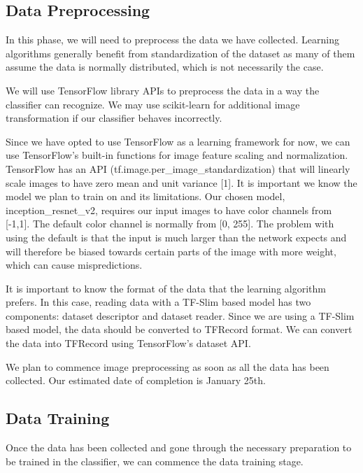 \documentclass[onecolumn, draftclsnofoot,10pt, compsoc]{IEEEtran}
\begin{document}
\subsection{Data Preprocessing}

In this phase, we will need to preprocess the data we have collected. Learning algorithms generally benefit from standardization of the dataset as many of them assume the data is normally distributed, which is not necessarily the case.


We will use TensorFlow library APIs to preprocess the data in a way the classifier can recognize. We may use scikit-learn for additional image transformation if our classifier behaves incorrectly.


Since we have opted to use TensorFlow as a learning framework for now, we can use TensorFlow's built-in functions for image feature scaling and normalization. TensorFlow has an API (tf.image.per\_image\_standardization) that will linearly scale images to have zero mean and unit variance [1]. It is important we know the model we plan to train on and its limitations. Our chosen model, inception\_resnet\_v2, requires our input images to have color channels from [-1,1]. The default color channel is normally from [0, 255]. The problem with using the default is that the input is much larger than the network expects and will therefore be biased towards certain parts of the image with more weight, which can cause mispredictions. 

It is important to know the format of the data that the learning algorithm prefers. In this case, reading data with a TF-Slim based model has two components: dataset descriptor and dataset reader. Since we are using a TF-Slim based model, the data should be converted to TFRecord format. We can convert the data into TFRecord using TensorFlow's dataset API. 

We plan to commence image preprocessing as soon as all the data has been collected. Our estimated date of completion is January 25th. 

\subsection{Data Training}

Once the data has been collected and gone through the necessary preparation to be trained in the classifier, we can commence the data training stage. 
\end{document}
